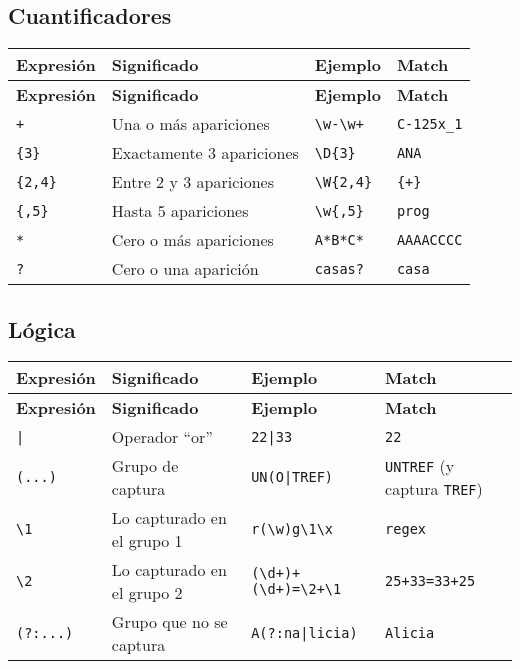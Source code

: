 \documentclass[a4paper, 10pt]{article}
\begin{document}
\subsection*{Cuantificadores}

\begin{longtable}{@{} p{2cm} p{7.5cm} p{3cm} p{5cm} @{}}
\toprule
\textbf{Expresión} & \textbf{Significado} & \textbf{Ejemplo} & \textbf{Match} \\
\midrule
\endfirsthead
\toprule
\textbf{Expresión} & \textbf{Significado} & \textbf{Ejemplo} & \textbf{Match} \\
\midrule
\endhead
\bottomrule
\endfoot
\bottomrule
\endlastfoot

\centering \verb!+!     & Una o más apariciones     & \verb!\w-\w+!  & \verb!C-125x_1! \\
\centering \verb!{3}!   & Exactamente 3 apariciones & \verb!\D{3}!   & \verb!ANA!      \\
\centering \verb!{2,4}! & Entre 2 y 3 apariciones   & \verb!\W{2,4}! & \verb!{+}!      \\
\centering \verb!{,5}!  & Hasta 5 apariciones       & \verb!\w{,5}!  & \verb!prog!     \\
\centering \verb!*!     & Cero o más apariciones    & \verb!A*B*C*!  & \verb!AAAACCCC! \\
\centering \verb!?!     & Cero o una aparición      & \verb!casas?!  & \verb!casa!     \\
\end{longtable}


\subsection*{Lógica}

\begin{longtable}{@{} p{2cm} p{7.5cm} p{3cm} p{5cm} @{}}
\toprule
\textbf{Expresión} & \textbf{Significado} & \textbf{Ejemplo} & \textbf{Match} \\
\midrule
\endfirsthead
\toprule
\textbf{Expresión} & \textbf{Significado} & \textbf{Ejemplo} & \textbf{Match} \\
\midrule
\endhead
\bottomrule
\endfoot
\bottomrule
\endlastfoot

\centering \verb!|!       & Operador ``or''            & \verb!22|33!             & \verb!22!                             \\
\centering \verb!(...)!   & Grupo de captura           & \verb!UN(O|TREF)!        & \verb!UNTREF! (y captura \verb!TREF!) \\
\centering \verb!\1!      & Lo capturado en el grupo 1 & \verb!r(\w)g\1\x!        & \verb!regex!                          \\
\centering \verb!\2!      & Lo capturado en el grupo 2 & \verb!(\d+)+(\d+)=\2+\1! & \verb!25+33=33+25!                    \\
\centering \verb!(?:...)! & Grupo que no se captura    & \verb!A(?:na|licia)!     & \verb!Alicia!                         \\
\end{longtable}
\end{document}
